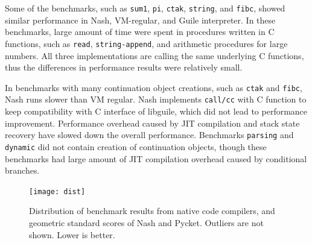 \documentclass[preprint, 10pt]{sigplanconf}
\begin{document}
Some of the benchmarks, such as \texttt{sum1}, \texttt{pi}, \texttt{ctak},
\texttt{string}, and \texttt{fibc}, showed similar performance in Nash,
VM-regular, and Guile interpreter. In these benchmarks, large amount of time
were spent in procedures written in C functions, such as \texttt{read},
\texttt{string-append}, and arithmetic procedures for large numbers.  All
three implementations are calling the same underlying C functions, thus the
differences in performance results were relatively small.

In benchmarks with many continuation object creations, such as \texttt{ctak}
and \texttt{fibc}, Nash runs slower than VM regular. Nash implements
\texttt{call/cc} with C function to keep compatibility with C interface of
libguile, which did not lead to performance improvement.  Performance overhead
caused by JIT compilation and stack state recovery have slowed down the
overall performance.  Benchmarks \texttt{parsing} and \texttt{dynamic} did not
contain creation of continuation objects, though these benchmarks had large
amount of JIT compilation overhead caused by conditional branches.

\begin{figure}
  \centering
  \texttt{[image: dist]}
  \caption{Distribution of benchmark results from native code compilers, and
    geometric standard scores of Nash and Pycket.  Outliers are not shown. Lower
    is better.}
  \label{fig:dist}
\end{figure}
\end{document}
